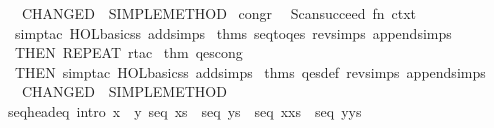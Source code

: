 \begin{isabellebody}
\endisaantiq
\ {}{}\ {}{}\ CHANGED\ {}{}\ SIMPLE{}METHOD{}\isanewline
{}\isanewline
\isanewline
{}\isamarkupfalse%
\ congr\ {}\ {}\isanewline
Scan{}succeed\ {}fn\ ctxt\ {}{}\isanewline
\ \ simp{}tac\ {}HOL{}basic{}ss\ addsimps\ %
\isaantiq
thms\ seq{}to{}qes\ rev{}simps\ append{}simps{}%
\endisaantiq
{}\ {}\isanewline
\ \ THEN\ {}REPEAT\ {}rtac\ %
\isaantiq
thm\ qes{}cong{}%
\endisaantiq
\ {}{}{}\isanewline
\ \ THEN\ simp{}tac\ {}HOL{}basic{}ss\ addsimps\ %
\isaantiq
thms\ qes{}def\ rev{}simps\ append{}simps{}%
\endisaantiq
{}\ {}\isanewline
\ \ {}{}\ CHANGED\ {}{}\ SIMPLE{}METHOD{}\isanewline
{}%
\endisatagML
{\isafoldML}%
%
\isadelimML
\isanewline
%
\endisadelimML
\isanewline
{}\isamarkupfalse%
\ seq{}head{}eq\ {}intro{}{}\ {}{}x\ {}\ y{}\ seq\ xs\ {}\ seq\ ys{}\ {}\ seq\ {}x{}xs{}\ {}\ seq\ {}y{}ys{}{}\isanewline

\end{isabellebody}
